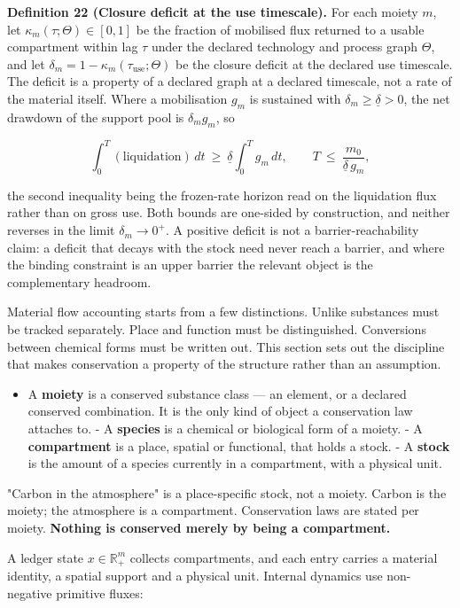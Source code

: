 \documentclass[11pt]{article}
\begin{document}
\textbf{Definition 22 (Closure deficit at the use timescale).} For each moiety \(m\), let \(\kappa_m(\tau;\Theta)\in[0,1]\) be the fraction of mobilised flux returned to a usable compartment within lag \(\tau\) under the declared technology and process graph \(\Theta\), and let \(\delta_m=\allowbreak{}1-\kappa_m(\tau_{\mathrm{use}};\Theta)\) be the closure deficit at the declared use timescale. The deficit is a property of a declared graph at a declared timescale, not a rate of the material itself. Where a mobilisation \(g_m\) is sustained with \(\delta_m\ge\underline\delta>0\), the net drawdown of the support pool is \(\delta_mg_m\), so 

$$\int_0^T(\text{liquidation})\,dt\ \ge\ \underline\delta\int_0^Tg_m\,dt, \qquad T\ \le\ \frac{m_0}{\underline\delta\,g_m},$$

 the second inequality being the frozen-rate horizon read on the liquidation flux rather than on gross use. Both bounds are one-sided by construction, and neither reverses in the limit \(\delta_m\to0^+\). A positive deficit is not a barrier-reachability claim: a deficit that decays with the stock need never reach a barrier, and where the binding constraint is an upper barrier the relevant object is the complementary headroom.

Material flow accounting starts from a few distinctions. Unlike substances must be tracked separately. Place and function must be distinguished. Conversions between chemical forms must be written out. This section sets out the discipline that makes conservation a property of the structure rather than an assumption.

\begin{itemize}\setlength{\itemsep}{2pt}
\item A \textbf{moiety} is a conserved substance class --- an element, or a declared conserved combination. It is the only kind of object a conservation law attaches to. - A \textbf{species} is a chemical or biological form of a moiety. - A \textbf{compartment} is a place, spatial or functional, that holds a stock. - A \textbf{stock} is the amount of a species currently in a compartment, with a physical unit.
\end{itemize}

"Carbon in the atmosphere" is a place-specific stock, not a moiety. Carbon is the moiety; the atmosphere is a compartment. Conservation laws are stated per moiety. \textbf{Nothing is conserved merely by being a compartment.}

A ledger state \(x\in\mathbb{R}^m_+\) collects compartments, and each entry carries a material identity, a spatial support and a physical unit. Internal dynamics use non-negative primitive fluxes:
\end{document}
